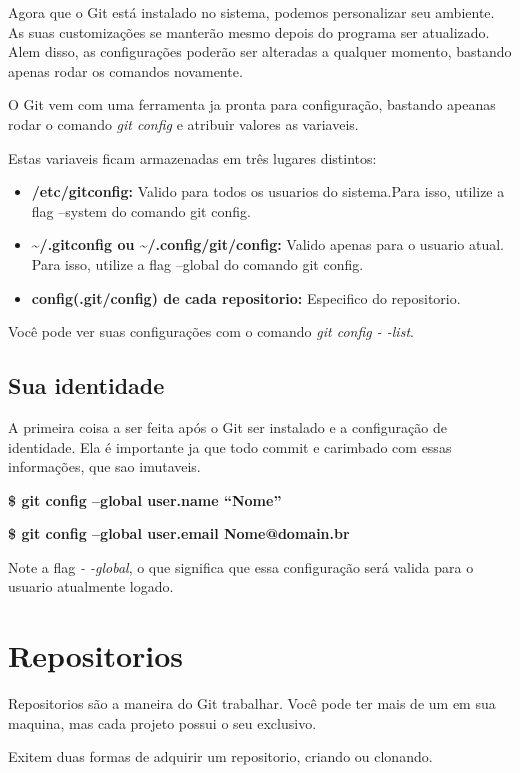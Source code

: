 \documentclass[]{article}
\begin{document}
Agora que o Git está instalado no sistema, podemos personalizar seu ambiente. As suas customizações se manterão mesmo depois do programa ser atualizado. Alem disso, as configurações poderão ser alteradas a qualquer momento, bastando apenas rodar os comandos novamente. 


O Git vem com uma ferramenta ja pronta para configuração, bastando apeanas rodar o comando \textit{git config} e atribuir valores as variaveis.


Estas variaveis ficam armazenadas em três lugares distintos:


\begin{itemize}
    \item {\textbf{/etc/gitconfig:} } Valido para todos os usuarios do sistema.Para isso, utilize a flag --system do comando git config.
    
    \item {\textbf{\textasciitilde/.gitconfig ou \textasciitilde/.config/git/config:} } Valido apenas para o usuario atual. Para isso, utilize a flag --global do comando git config.
    
    \item {\textbf{config(.git/config) de  cada repositorio:} } Especifico  do repositorio.
\end{itemize}
Você pode ver suas configurações com o comando \textit{git config - -list}.

\subsection*{Sua identidade}
A primeira coisa a ser feita  após o Git ser instalado e a configuração de identidade. Ela é importante ja que todo commit e carimbado com essas informações, que sao imutaveis.

\textbf{\$ git config --global user.name ``Nome'' }

\textbf{\$ git config --global user.email Nome@domain.br}

Note a flag \textit{- -global}, o que significa que essa configuração será valida para o usuario atualmente logado.

\section{Repositorios}

Repositorios são a maneira do Git  trabalhar. Você pode ter mais de um em sua maquina, mas cada projeto possui o seu exclusivo.

Exitem duas formas de adquirir um repositorio, criando ou clonando.
\end{document}
